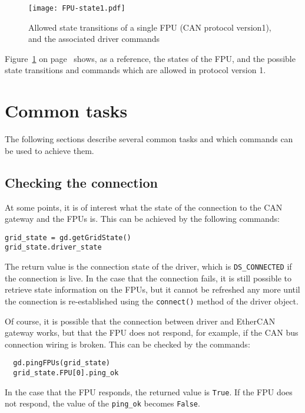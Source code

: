 \documentclass{scrartcl}[12pt,a4paper]
\begin{document}
\begin{figure}

  \texttt{[image: FPU-state1.pdf]}
  \caption{Allowed state transitions of a single FPU (CAN protocol
    version1), and the associated driver commands}
  \label{fig:states}
\end{figure}


Figure~\ref{fig:states} on page~\pageref{fig:states} shows, as a
reference, the states of the FPU, and the possible state transitions
and commands which are allowed in protocol version 1.




\section{Common tasks}

The following sections describe several common tasks
and which commands can be used to achieve them.


\subsection{Checking the connection}

At some points, it is of interest what the state of
the connection to the CAN gateway and the FPUs is.
This can be achieved by the following commands:
\begin{verbatim}
grid_state = gd.getGridState()
grid_state.driver_state  
\end{verbatim}

The return value is the connection state of the driver, which is
\texttt{DS\_CONNECTED} if the connection is live.  In the case that the
connection fails, it is still possible to retrieve state information
on the FPUs, but it cannot be refreshed any more until the connection
is re-established using the \texttt{connect()} method of the driver
object.

Of course, it is possible that the connection between driver and
EtherCAN gateway works, but that the FPU does not respond, for
example, if the CAN bus connection wiring is broken. This can be
checked by the commands:

\begin{verbatim}
  gd.pingFPUs(grid_state)
  grid_state.FPU[0].ping_ok
\end{verbatim}

In the case that the FPU responds, the returned value is
\texttt{True}.  If the FPU does not respond, the value of the
\verb+ping_ok+ becomes \texttt{False}.
\end{document}
